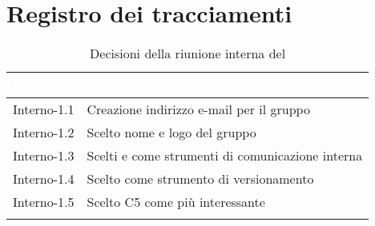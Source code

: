 \section{Registro dei tracciamenti}
{

\renewcommand{\arraystretch}{1.5}
\centering
\begin{longtable}{C{3cm} C{9cm}}
\textcolor{white}{\textbf{Codice}}&
\textcolor{white}{\textbf{Decisione}}\\	
\endhead
		
Interno-1.1 & Creazione indirizzo e-mail per il gruppo\\

Interno-1.2 & Scelto nome e logo del gruppo\\

Interno-1.3 & Scelti  e  come strumenti di comunicazione interna\\

Interno-1.4 & Scelto  come strumento di versionamento\\

Interno-1.5 & Scelto C5 come  più interessante\\
		
\caption{Decisioni della riunione interna del \Data{}}		
\end{longtable}
}

